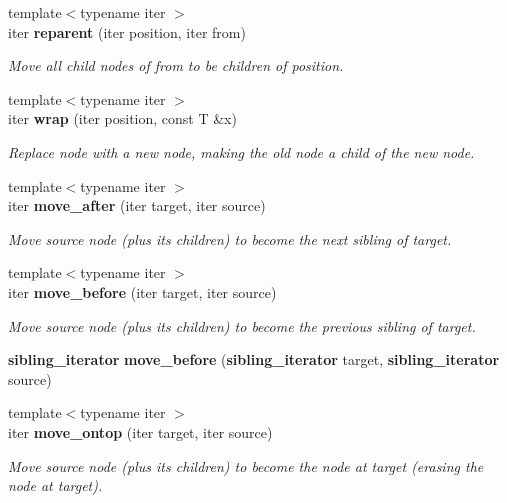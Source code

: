 \begin{DoxyCompactItemize}
{\footnotesize template$<$typename iter $>$ }\\iter {\bf reparent} (iter position, iter from)
\begin{DoxyCompactList}\small\item\em Move all child nodes of \textquotesingle{}from\textquotesingle{} to be children of \textquotesingle{}position\textquotesingle{}. \end{DoxyCompactList}\item 
{\footnotesize template$<$typename iter $>$ }\\iter {\bf wrap} (iter position, const T \&x)
\begin{DoxyCompactList}\small\item\em Replace node with a new node, making the old node a child of the new node. \end{DoxyCompactList}\item 
{\footnotesize template$<$typename iter $>$ }\\iter {\bf move\+\_\+after} (iter target, iter source)
\begin{DoxyCompactList}\small\item\em Move \textquotesingle{}source\textquotesingle{} node (plus its children) to become the next sibling of \textquotesingle{}target\textquotesingle{}. \end{DoxyCompactList}\item 
{\footnotesize template$<$typename iter $>$ }\\iter {\bf move\+\_\+before} (iter target, iter source)
\begin{DoxyCompactList}\small\item\em Move \textquotesingle{}source\textquotesingle{} node (plus its children) to become the previous sibling of \textquotesingle{}target\textquotesingle{}. \end{DoxyCompactList}\item 
{\bf sibling\+\_\+iterator} {\bf move\+\_\+before} ({\bf sibling\+\_\+iterator} target, {\bf sibling\+\_\+iterator} source)
\item 
{\footnotesize template$<$typename iter $>$ }\\iter {\bf move\+\_\+ontop} (iter target, iter source)
\begin{DoxyCompactList}\small\item\em Move \textquotesingle{}source\textquotesingle{} node (plus its children) to become the node at \textquotesingle{}target\textquotesingle{} (erasing the node at \textquotesingle{}target\textquotesingle{}). \end{DoxyCompactList}\item 

\end{DoxyCompactItemize}
